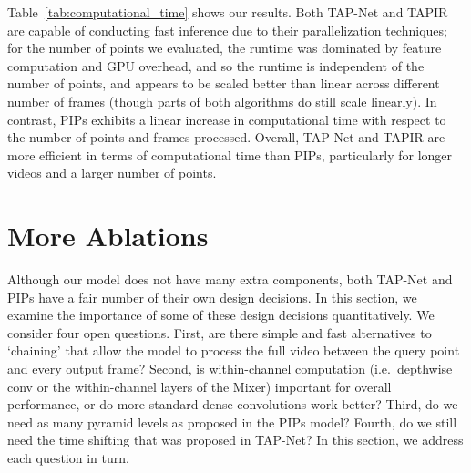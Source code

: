 \documentclass[10pt,twocolumn,letterpaper]{article}
\begin{document}
Table~\ref{tab:computational_time}  shows our results.  Both TAP-Net and TAPIR are capable of conducting fast inference due to their parallelization techniques; for the number of points we evaluated, the runtime was dominated by feature computation and GPU overhead, and so the runtime is independent of the number of points, and appears to be scaled better than linear across different number of frames (though parts of both algorithms do still scale linearly).  In contrast, PIPs exhibits a linear increase in computational time with respect to the number of points and frames processed. Overall, TAP-Net and TAPIR are more efficient in terms of computational time than PIPs, particularly for longer videos and a larger number of points.    









\section{More Ablations}
\label{sec:ablation}
Although our model does not have many extra components, both TAP-Net and PIPs have a fair number of their own design decisions. In this section, we examine the importance of some of these design decisions quantitatively.  We consider four open questions.  First, are there simple and fast alternatives to `chaining' that allow the model to process the full video between the query point and every output frame?  Second, is within-channel computation (i.e.\ depthwise conv or the within-channel layers of the Mixer) important for overall performance, or do more standard dense convolutions work better?  Third, do we need as many pyramid levels as proposed in the PIPs model?  Fourth, do we still need the time shifting that was proposed in TAP-Net?  In this section, we address each question in turn.

\begin{table}[t]
\caption{\textbf{Comparison of the TAPIR model with and without an RNN.}  We see relatively little benefit for this kind of temporal integration, though we do not see a detriment either.  This suggests an area for future research.}
\label{tab:rnn_compare}
\end{table}
\end{document}
